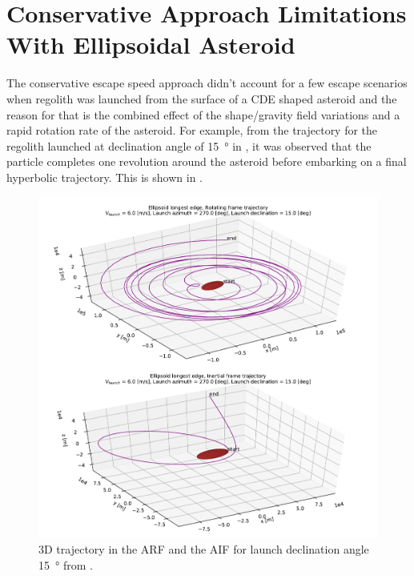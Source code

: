 \section{Conservative Approach Limitations With Ellipsoidal Asteroid}
\label{sec:conservative_escape_cde_limitations}
The conservative escape speed approach didn't account for a few escape scenarios when regolith was launched from the surface of a \gls{CDE} shaped asteroid and the reason for that is the combined effect of the shape/gravity field variations and a rapid rotation rate of the asteroid. For example, from the trajectory for the regolith launched at declination angle of \SI{15}{\degree} in , it was observed that the particle completes one revolution around the asteroid before embarking on a final hyperbolic trajectory. This is shown in .
\begin{figure}[htb]
\centering
\captionsetup{justification=centering}
\includegraphics[width=\textwidth, height=0.7\textheight, keepaspectratio=true]{non_conservative_escape_speed/multiRev_3D_trajectory_declination15.pdf}
\caption{3D trajectory in the \gls{ARF} and the \gls{AIF} for launch declination angle \SI{15}{\degree} from .}
\label{fig:3d_traj_declination_15}
\end{figure}

